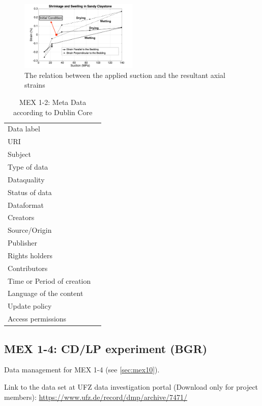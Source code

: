 \begin{figure}[!ht]
\centering
\includegraphics[width=0.5\textwidth]{figures/Amir_Shrinkage_Strain_Data.png}
\caption{The relation between the applied suction and the resultant axial strains}
\label{fig:Amir_Shrinkage_Strain_Data}
\end{figure}

\begin{table}[h!]
\caption{MEX 1-2: Meta Data according to Dublin Core}
\label{tab:}
\small
\begin{tabular}{R{3cm}|L{7cm}}
\hline
%
Data label &  \\
URI &  \\
Subject  &  \\
Type of data  &  \\
Dataquality  &  \\
Status of data  &  \\
Dataformat  & \\
Creators  &  \\
Source/Origin &  \\
Publisher  &  \\
Rights holders &  \\
Contributors &  \\
Time or Period of creation &  \\
Language of the content &  \\
Update policy &  \\
Access permissions &  \\
%
\hline
\end{tabular}
\end{table}

\subsection{MEX 1-4: CD/LP experiment (BGR)}

Data management for MEX 1-4 (see \ref{sec:mex10}).

Link to the data set at UFZ data investigation portal (Download only for project members):
\hyperlink{https://www.ufz.de/record/dmp/archive/7471/}{https://www.ufz.de/record/dmp/archive/7471/}

